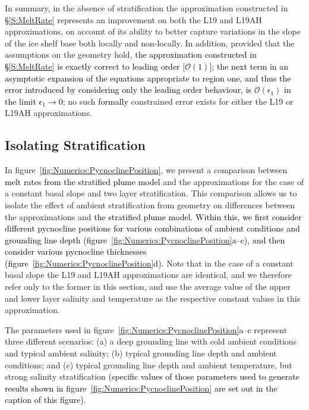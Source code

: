 \documentclass[openacc]{rsproca_new}%
\newcommand{\order}[1]{\mathcal{O}(#1)}
\newcommand{\red}[1]{{\color{red} #1}}
\newcommand{\blue}[1]{{\color{blue} #1}}
\newcommand{\rout}[1]{\red{\st{#1}}}\newcommand{\ab}[1]{\textcolor{Green}{#1}}\newcommand{\about}[1]{\textcolor{Cyan}{\sout{#1}}}
\renewcommand{\rout}[1]{{}} %
\renewcommand{\blue}[1]{{\textcolor{black}{#1}}} %
\renewcommand{\red}[1]{{}} %
\newcommand{\epsone}{\epsilon_{1}} %
\begin{document}
In summary, in the absence of stratification the approximation constructed in \S\ref{S:MeltRate} represents an improvement on both the L19 and L19AH approximations, on account of its ability to better capture variations in the slope of the ice shelf base both locally and non-locally. In addition, provided that the assumptions on the geometry hold, \blue{the approximation constructed in \S\ref{S:MeltRate} is exactly correct to leading order [$\order{1}$]; the next term in an asymptotic expansion of the equations appropriate to region one, and thus the error introduced by considering only the leading order behaviour, is $\order{\epsone}$} \rout{we have formally quantified the error as}\blue{in the limit $\epsone \to 0$}; no such \blue{formally} constrained error exists for either the L19 or L19AH approximations. 

\subsection{Isolating Stratification}
In figure~\ref{fig:Numerics:PycnoclinePosition}, we present a comparison between \blue{melt rates from the stratified plume model}\rout{numerically obtained melt rates} and the approximations for the case of a constant basal slope and two layer stratification. This comparison allows us to isolate the effect of ambient stratification from geometry on differences between the approximations and \blue{the stratified plume model}\rout{numerical solutions}. \blue{Within this, we first consider different pycnocline positions for various combinations of ambient conditions and grounding line depth (figure~\ref{fig:Numerics:PycnoclinePosition}a--c), and then consider various pycnocline thicknesses (figure~\ref{fig:Numerics:PycnoclinePosition}d).}  Note that in the case of a constant basal slope the L19 and L19AH approximations are identical, and we therefore refer only to the former in this section, and use the average value of the upper and lower layer salinity and temperature as the respective constant values in this approximation.

The parameters used in figure~\ref{fig:Numerics:PycnoclinePosition}\blue{a--c} represent three different scenarios: (a) a deep grounding line with cold ambient conditions and typical ambient salinity; (b) typical grounding line depth and ambient conditions; and (c) typical grounding line depth and ambient temperature, but strong salinity stratification \blue{(specific values of those parameters used to generate results shown in figure~\ref{fig:Numerics:PycnoclinePosition} are set out in the caption of this figure)}.
\end{document}
